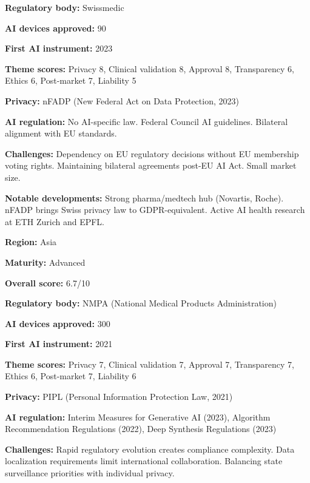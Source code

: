 \noindent\textbf{Regulatory body:} Swissmedic\par
\noindent\textbf{AI devices approved:} 90\par
\noindent\textbf{First AI instrument:} 2023\par
\noindent\textbf{Theme scores:} Privacy 8, Clinical validation 8, Approval 8, Transparency 6, Ethics 6, Post-market 7, Liability 5\par
\noindent\textbf{Privacy:} nFADP (New Federal Act on Data Protection, 2023)\par
\noindent\textbf{AI regulation:} No AI-specific law. Federal Council AI guidelines. Bilateral alignment with EU standards.\par
\noindent\textbf{Challenges:} Dependency on EU regulatory decisions without EU membership voting rights. Maintaining bilateral agreements post-EU AI Act. Small market size.\par
\noindent\textbf{Notable developments:} Strong pharma/medtech hub (Novartis, Roche). nFADP brings Swiss privacy law to GDPR-equivalent. Active AI health research at ETH Zurich and EPFL.\par
\vspace{0.55em}
\par
\vspace{0.15em}
\noindent\textbf{Region:} Asia\par
\noindent\textbf{Maturity:} Advanced\par
\noindent\textbf{Overall score:} 6.7/10\par
\noindent\textbf{Regulatory body:} NMPA (National Medical Products Administration)\par
\noindent\textbf{AI devices approved:} 300\par
\noindent\textbf{First AI instrument:} 2021\par
\noindent\textbf{Theme scores:} Privacy 7, Clinical validation 7, Approval 7, Transparency 7, Ethics 6, Post-market 7, Liability 6\par
\noindent\textbf{Privacy:} PIPL (Personal Information Protection Law, 2021)\par
\noindent\textbf{AI regulation:} Interim Measures for Generative AI (2023), Algorithm Recommendation Regulations (2022), Deep Synthesis Regulations (2023)\par
\noindent\textbf{Challenges:} Rapid regulatory evolution creates compliance complexity. Data localization requirements limit international collaboration. Balancing state surveillance priorities with individual privacy.\par
